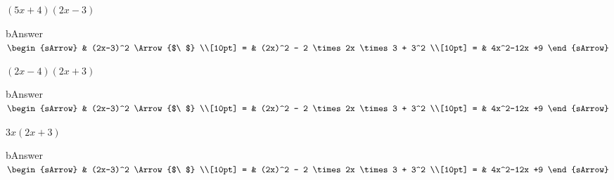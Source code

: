 \begin{mtask}
      \task[] $(5x+4)(2x-3)$
              \begin{envOut}[equal height group=A-Rev-1]{bAnswer}
			       $\begin{sArrow}
			             & (2x-3)^2         \Arrow{$\ $}        \\[10pt]  %
                       = & (2x)^2 - 2 \times 2x \times 3 + 3^2  \\[10pt]      
					   = & 4x^2-12x +9
	                \end{sArrow}$
              \end{envOut}
      \task[] $(2x-4)(2x+3)$
              \begin{envOut}[equal height group=A-Rev-1]{bAnswer}
			       $\begin{sArrow}
			             & (2x-3)^2         \Arrow{$\ $}        \\[10pt]  %
                       = & (2x)^2 - 2 \times 2x \times 3 + 3^2  \\[10pt]      
					   = & 4x^2-12x +9
	                \end{sArrow}$
              \end{envOut}
      \task[] $3x(2x+3)$
              \begin{envOut}[equal height group=A-Rev-1]{bAnswer}
			       $\begin{sArrow}
			             & (2x-3)^2         \Arrow{$\ $}        \\[10pt]  %
                       = & (2x)^2 - 2 \times 2x \times 3 + 3^2  \\[10pt]      
					   = & 4x^2-12x +9
	                \end{sArrow}$
              \end{envOut}
\end{mtask}

